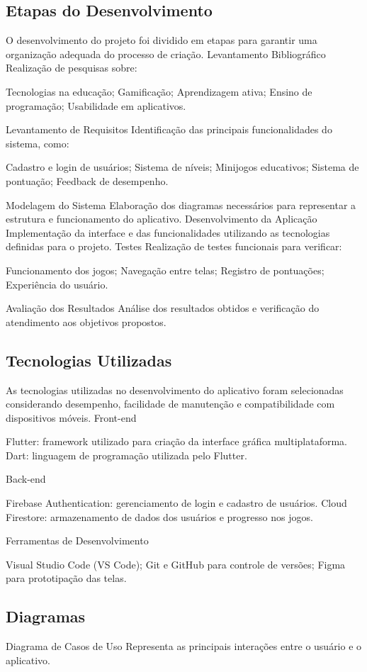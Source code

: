 \documentclass{article}
\begin{document}
\subsection{ Etapas do Desenvolvimento}
O desenvolvimento do projeto foi dividido em etapas para garantir uma organização adequada do processo de criação.
Levantamento Bibliográfico
Realização de pesquisas sobre:

Tecnologias na educação;
Gamificação;
Aprendizagem ativa;
Ensino de programação;
Usabilidade em aplicativos.

Levantamento de Requisitos
Identificação das principais funcionalidades do sistema, como:

Cadastro e login de usuários;
Sistema de níveis;
Minijogos educativos;
Sistema de pontuação;
Feedback de desempenho.

Modelagem do Sistema
Elaboração dos diagramas necessários para representar a estrutura e funcionamento do aplicativo.
Desenvolvimento da Aplicação
Implementação da interface e das funcionalidades utilizando as tecnologias definidas para o projeto.
Testes
Realização de testes funcionais para verificar:

Funcionamento dos jogos;
Navegação entre telas;
Registro de pontuações;
Experiência do usuário.

Avaliação dos Resultados
Análise dos resultados obtidos e verificação do atendimento aos objetivos propostos.

\subsection{ Tecnologias Utilizadas}
As tecnologias utilizadas no desenvolvimento do aplicativo foram selecionadas considerando desempenho, facilidade de manutenção e compatibilidade com dispositivos móveis.
Front-end

Flutter: framework utilizado para criação da interface gráfica multiplataforma.
Dart: linguagem de programação utilizada pelo Flutter.

Back-end

Firebase Authentication: gerenciamento de login e cadastro de usuários.
Cloud Firestore: armazenamento de dados dos usuários e progresso nos jogos.

Ferramentas de Desenvolvimento

Visual Studio Code (VS Code);
Git e GitHub para controle de versões;
Figma para prototipação das telas.


\subsection{Diagramas}
Diagrama de Casos de Uso
Representa as principais interações entre o usuário e o aplicativo.
\end{document}
